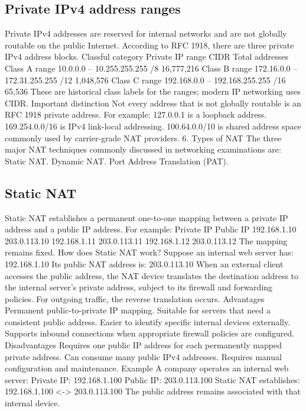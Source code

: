 \subsection{Private IPv4 address ranges}
Private IPv4 addresses are reserved for internal networks and are not globally routable on the public Internet.
According to RFC 1918, there are three private IPv4 address blocks.
Classful category
Private IP range
CIDR
Total addresses
Class A range
10.0.0.0 -- 10.255.255.255
/8
16,777,216
Class B range
172.16.0.0 -- 172.31.255.255
/12
1,048,576
Class C range
192.168.0.0 -- 192.168.255.255
/16
65,536
These are historical class labels for the ranges; modern IP networking uses CIDR.
Important distinction
Not every address that is not globally routable is an RFC 1918 private address.
For example:
127.0.0.1 is a loopback address.
169.254.0.0/16 is IPv4 link-local addressing.
100.64.0.0/10 is shared address space commonly used by carrier-grade NAT providers.
6. Types of NAT
The three major NAT techniques commonly discussed in networking examinations are:
Static NAT.
Dynamic NAT.
Port Address Translation (PAT).
\subsection{Static NAT}
Static NAT establishes a permanent one-to-one mapping between a private IP address and a public IP address.
For example:
Private IP
Public IP
192.168.1.10
203.0.113.10
192.168.1.11
203.0.113.11
192.168.1.12
203.0.113.12
The mapping remains fixed.
How does Static NAT work?
Suppose an internal web server has:
192.168.1.10
Its public NAT address is:
203.0.113.10
When an external client accesses the public address, the NAT device translates the destination address to the internal server's private address, subject to its firewall and forwarding policies.
For outgoing traffic, the reverse translation occurs.
Advantages
Permanent public-to-private IP mapping.
Suitable for servers that need a consistent public address.
Easier to identify specific internal devices externally.
Supports inbound connections when appropriate firewall policies are configured.
Disadvantages
Requires one public IP address for each permanently mapped private address.
Can consume many public IPv4 addresses.
Requires manual configuration and maintenance.
Example
A company operates an internal web server:
Private IP: 192.168.1.100 Public IP: 203.0.113.100
Static NAT establishes:
192.168.1.100 <-> 203.0.113.100
The public address remains associated with that internal device.
